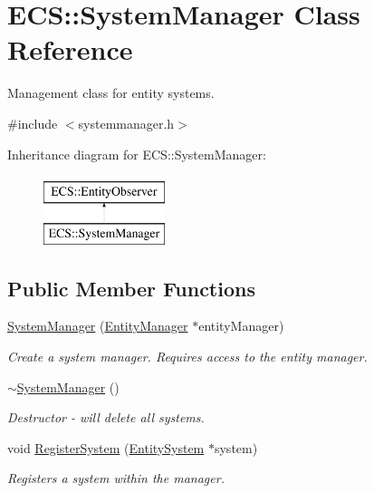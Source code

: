 \hypertarget{class_e_c_s_1_1_system_manager}{\section{E\-C\-S\-:\-:System\-Manager Class Reference}
\label{class_e_c_s_1_1_system_manager}
}


Management class for entity systems.  




{\ttfamily \#include $<$systemmanager.\-h$>$}

Inheritance diagram for E\-C\-S\-:\-:System\-Manager\-:\begin{figure}[H]
\begin{center}
\leavevmode
\includegraphics[height=2.000000cm]{class_e_c_s_1_1_system_manager}
\end{center}
\end{figure}
\subsection*{Public Member Functions}
\begin{DoxyCompactItemize}
\item 
\hyperlink{class_e_c_s_1_1_system_manager_a50bff38d0cf1b0508746f1c63c492553}{System\-Manager} (\hyperlink{class_e_c_s_1_1_entity_manager}{Entity\-Manager} $\ast$entity\-Manager)
\begin{DoxyCompactList}\small\item\em Create a system manager. Requires access to the entity manager. \end{DoxyCompactList}\item 
\hypertarget{class_e_c_s_1_1_system_manager_a13ba9ced2fbe676282e1c43d12d1f3d8}{\hyperlink{class_e_c_s_1_1_system_manager_a13ba9ced2fbe676282e1c43d12d1f3d8}{$\sim$\-System\-Manager} ()}\label{class_e_c_s_1_1_system_manager_a13ba9ced2fbe676282e1c43d12d1f3d8}

\begin{DoxyCompactList}\small\item\em Destructor -\/ will delete all systems. \end{DoxyCompactList}\item 
void \hyperlink{class_e_c_s_1_1_system_manager_a429f0b17229926adea3315c736232e7d}{Register\-System} (\hyperlink{class_e_c_s_1_1_entity_system}{Entity\-System} $\ast$system)
\begin{DoxyCompactList}\small\item\em Registers a system within the manager. \end{DoxyCompactList}\end{DoxyCompactItemize}
